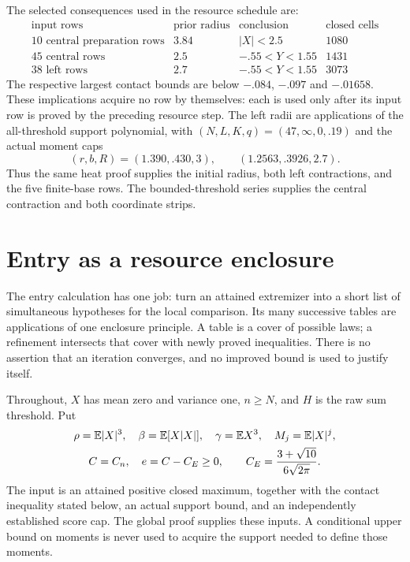 The selected consequences used in the resource schedule are:
\[
\begin{array}{l|c|c|r}
\text{input rows}&\text{prior radius}&\text{conclusion}&\text{closed cells}\\\hline
10\text{ central preparation rows}&3.84&|X|<2.5&1080\\
45\text{ central rows}&2.5&-.55<Y<1.55&1431\\
38\text{ left rows}&2.7&-.55<Y<1.55&3073
\end{array}
\]
The respective largest contact bounds are below $-.084$, $-.097$ and
$-.01658$. These implications acquire no row by themselves: each is
used only after its input row is proved by the preceding resource step.
The left radii are applications of the all-threshold support polynomial,
with $(N,L,K,q)=(47,\infty,0,.19)$ and the actual moment caps
\[
 (r,b,R)=(1.390,.430,3),\qquad (1.2563,.3926,2.7).
\]
Thus the same heat proof supplies the initial radius, both left
contractions, and the five finite-base rows. The bounded-threshold
series supplies the central contraction and both coordinate strips.


\section{Entry as a resource enclosure}\label{re:entry}

The entry calculation has one job: turn an attained extremizer into a
short list of simultaneous hypotheses for the local comparison. Its many
successive tables are applications of one enclosure principle. A table
is a cover of possible laws; a refinement intersects that cover with
newly proved inequalities. There is no assertion that an iteration
converges, and no improved bound is used to justify itself.

Throughout, $X$ has mean zero and variance one, $n\ge N$, and $H$ is
the raw sum threshold. Put
\[\begin{gathered}
 \rho=\mathbb E|X|^3,\quad \beta=\mathbb E[X|X|],\quad\gamma=\mathbb E X^3,\quad M_j=\mathbb E|X|^j,\\
 C=C_n,\quad e=C-C_E\ge0,\qquad C_E=\frac{3+\sqrt{10}}{6\sqrt{2\pi}}.
\end{gathered}\]
The input is an attained positive closed maximum, together with the
contact inequality stated below, an actual support bound, and an
independently established score cap. The global proof supplies these
inputs. A conditional upper bound on moments is never used to acquire
the support needed to define those moments.

